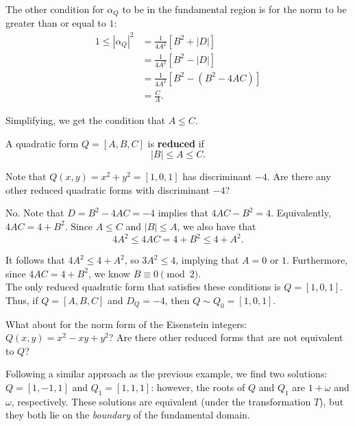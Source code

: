 \documentclass[11pt]{article}
\begin{document}
The other condition for $\alpha_Q$ to be in the fundamental region is for the norm to be greater than or equal to $1$:
\begin{align*}
    1 \leq |\alpha_Q|^2 &= \frac{1}{4A^2} \left[ B^2 + |D| \right] \\
    &= \frac{1}{4A^2} \left[ B^2 - |D| \right] \\
    &= \frac{1}{4A^2} \left[ B^2 - (B^2 - 4AC) \right] \\
    &= \frac{C}{A}.
\end{align*}

Simplifying, we get the condition that $A \leq C$. 

\begin{lemma}
A quadratic form $Q = [A, B, C]$ is \textbf{reduced} if
\[
    |B| \leq A \leq C.
\]
\end{lemma}

\begin{exercise}
Note that $Q(x,y) = x^2 + y^2 = [1, 0, 1]$ has discriminant $-4$. Are there any other reduced quadratic forms with discriminant $-4$?
\end{exercise}

\begin{answer}
No. Note that $D = B^2 - 4AC = -4$ implies that $4AC - B^2 = 4$. Equivalently, $4AC = 4+B^2$. Since $A \leq C$ and $|B| \leq A$, we also have that
\[
    4A^2 \leq 4AC = 4 + B^2 \leq 4 + A^2.
\]

It follows that $4A^2 \leq 4 + A^2$, so $3A^2 \leq 4$, implying that $A = 0$ or $1$. Furthermore, since $4AC = 4 + B^2$, we know $B \equiv 0 \pmod 2$. \\

The only reduced quadratic form that satisfies these conditions is $Q = [1, 0, 1]$. Thus, if $Q = [A, B, C]$ and $D_Q = -4$, then $Q \sim Q_0 = [1, 0, 1]$. 
\end{answer}

\begin{exercise}
What about for the norm form of the Eisenstein integers: $Q(x, y) = x^2 - xy + y^2$? Are there other reduced forms that are not equivalent to $Q$?    
\end{exercise}

\begin{answer}
Following a similar approach as the previous example, we find two solutions: $Q = [1, -1, 1]$ and $Q_1 = [1, 1, 1]$: however, the roots of $Q$ and $Q_1$ are $1+\omega$ and $\omega$, respectively. These solutions are equivalent (under the transformation $T$), but they both lie on the \textit{boundary} of the fundamental domain.
\end{answer}
\end{document}
